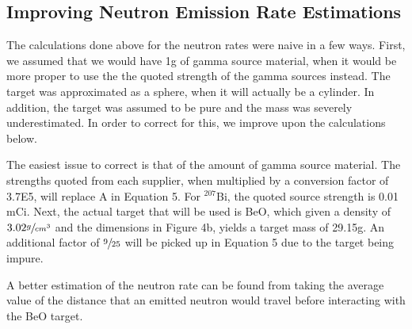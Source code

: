 \documentclass[%
12pt,
twoside,
reprint,
amsmath,amssymb,
aps,
]{article}
\begin{document}
	\subsection{Improving Neutron Emission Rate Estimations}
	\par The calculations done above for the neutron rates were naive in a few ways. First, we assumed that we would have 1g of gamma source material, when it would be more proper to use the the quoted strength of the gamma sources instead. The target was approximated as a sphere, when it will actually be a cylinder. In addition, the target was assumed to be pure and the mass was severely underestimated. In order to correct for this, we improve upon the calculations below.
	\par The easiest issue to correct is that of the amount of gamma source material. The strengths quoted from each supplier, when multiplied by a conversion factor of 3.7E5, will replace A in Equation 5. For $^{207}$Bi, the quoted source strength is 0.01 mCi. Next, the actual target that will be used is BeO, which given a density of $3.02 \sfrac{g}{cm^{3}}$ and the dimensions in Figure 4b, yields a target mass of 29.15g. An additional factor of $\sfrac{9}{25}$ will be picked up in Equation 5 due to the target being impure.
	\par A better estimation of the neutron rate can be found from taking the average value of the distance that an emitted neutron would travel before interacting with the BeO target.
	
\end{document}
